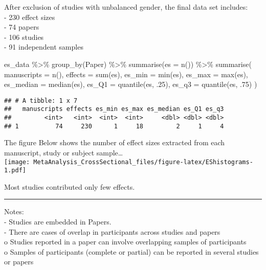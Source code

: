 \documentclass[
]{book}
\newenvironment{Shaded}{\begin{snugshade}}{\end{snugshade}}
\newcommand{\AttributeTok}[1]{\textcolor[rgb]{0.77,0.63,0.00}{#1}}
\newcommand{\DecValTok}[1]{\textcolor[rgb]{0.00,0.00,0.81}{#1}}
\newcommand{\FunctionTok}[1]{\textcolor[rgb]{0.00,0.00,0.00}{#1}}
\newcommand{\NormalTok}[1]{#1}
\newcommand{\SpecialCharTok}[1]{\textcolor[rgb]{0.00,0.00,0.00}{#1}}
\begin{document}
After exclusion of studies with unbalanced gender, the final data set includes:\\
- 230 effect sizes\\
- 74 papers\\
- 106 studies\\
- 91 independent samples

\begin{Shaded}
\begin{Highlighting}[]
\NormalTok{es\_data }\SpecialCharTok{\%\textgreater{}\%}
  \FunctionTok{group\_by}\NormalTok{(Paper) }\SpecialCharTok{\%\textgreater{}\%}
  \FunctionTok{summarise}\NormalTok{(}\AttributeTok{es =} \FunctionTok{n}\NormalTok{()) }\SpecialCharTok{\%\textgreater{}\%}
  \FunctionTok{summarise}\NormalTok{(}
    \AttributeTok{manuscripts =} \FunctionTok{n}\NormalTok{(), }
    \AttributeTok{effects =} \FunctionTok{sum}\NormalTok{(es),}
    \AttributeTok{es\_min =} \FunctionTok{min}\NormalTok{(es),}
    \AttributeTok{es\_max =} \FunctionTok{max}\NormalTok{(es),}
    \AttributeTok{es\_median =} \FunctionTok{median}\NormalTok{(es),}
    \AttributeTok{es\_Q1 =} \FunctionTok{quantile}\NormalTok{(es, .}\DecValTok{25}\NormalTok{),}
    \AttributeTok{es\_q3 =} \FunctionTok{quantile}\NormalTok{(es, .}\DecValTok{75}\NormalTok{)}
\NormalTok{  ) }
\end{Highlighting}
\end{Shaded}

\begin{verbatim}
## # A tibble: 1 x 7
##   manuscripts effects es_min es_max es_median es_Q1 es_q3
##         <int>   <int>  <int>  <int>     <dbl> <dbl> <dbl>
## 1          74     230      1     18         2     1     4
\end{verbatim}

The figure Below shows the number of effect sizes extracted from each manuscript, study or subject sample\ldots{}\\
\texttt{[image: MetaAnalysis\_CrossSectional\_files/figure-latex/EShistograms-1.pdf]}

Most studies contributed only few effects.

\begin{center}\rule{0.5\linewidth}{0.5pt}\end{center}

Notes:\\
- Studies are embedded in Papers.\\
- There are cases of overlap in participants across studies and papers\\
o Studies reported in a paper can involve overlapping samples of participants\\
o Samples of participants (complete or partial) can be reported in several studies or papers
\end{document}
